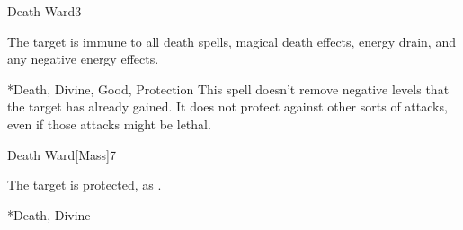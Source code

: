 \begin{spellsection}{Death Ward}{3}
\begin{spellheader}
\end{spellheader}
\begin{spellcontent}
    \begin{spelltargetinginfo}
    \end{spelltargetinginfo}
    \begin{spelleffects}
        \spelleffect The target is immune to all death spells, magical death effects, energy drain, and any negative energy effects.
        \spelldur \durshort
    \end{spelleffects}
\end{spellcontent}
\begin{spellfooter}
    *{Death, Divine, Good, Protection}
    \spellnotes This spell doesn't remove negative levels that the target has already gained. It does not protect against other sorts of attacks, even if those attacks might be lethal.
\end{spellfooter}
\end{spellsection}

\begin{spellsection}{Death Ward}[Mass]{7}
\begin{spellheader}
\end{spellheader}
\begin{spellcontent}
    \begin{spelltargetinginfo}
    \end{spelltargetinginfo}
    \begin{spelleffects}
        \spelleffect The target is protected, as .
        \spelldur \durshort
    \end{spelleffects}
\end{spellcontent}
\begin{spellfooter}
    *{Death, Divine}
\end{spellfooter}
\end{spellsection}

